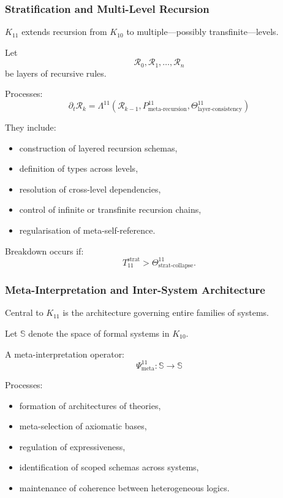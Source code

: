 \subsubsection{Stratification and Multi-Level Recursion}

$K_{11}$ extends recursion from $K_{10}$ to multiple—possibly transfinite—levels.

Let
\[
\mathcal{R}_0, \mathcal{R}_1, \ldots, \mathcal{R}_n
\]
be layers of recursive rules.

Processes:
\[
\partial_t \mathcal{R}_k
= \Lambda^{11}(\mathcal{R}_{k-1},
               P^{11}_{\text{meta-recursion}},
               \Theta^{11}_{\text{layer-consistency}})
\]

They include:
\begin{itemize}
    \item construction of layered recursion schemas,
    \item definition of types across levels,
    \item resolution of cross-level dependencies,
    \item control of infinite or transfinite recursion chains,
    \item regularisation of meta-self-reference.
\end{itemize}

Breakdown occurs if:
\[
T_{11}^{\text{strat}} > \Theta^{11}_{\text{strat-collapse}}.
\]

\subsubsection{Meta-Interpretation and Inter-System Architecture}

Central to $K_{11}$ is the architecture governing entire families of systems.

Let $\mathbb{S}$ denote the space of formal systems in $K_{10}$.

A meta-interpretation operator:
\[
\Psi^{11}_{\text{meta}} : \mathbb{S} \to \mathbb{S}
\]

Processes:
\begin{itemize}
    \item formation of architectures of theories,
    \item meta-selection of axiomatic bases,
    \item regulation of expressiveness,
    \item identification of scoped schemas across systems,
    \item maintenance of coherence between heterogeneous logics.
\end{itemize}

